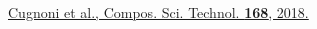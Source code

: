 \documentclass[first,firstsupp,lastsupp,last,hyperref,table]{ETHclass}
\begin{document}
\begin{frame}
\begin{columns}[c]
\begin{column}{0.5\textwidth}
\centering
\end{column}
\end{columns}
\vspace{0.15cm}
\begin{columns}[b]
\begin{column}{0.5\textwidth}
\centering
\pgfmathsetmacro{}
\pgfmathsetmacro{}
{\fontsize{\fontsizeref}{\stretchref} \selectfont \href{https://doi.org/10.1016/j.compscitech.2018.08.037}{Cugnoni et al., Compos. Sci. Technol. \textbf{168}, 2018.}}
\end{column}
\begin{column}{0.5\textwidth}
\centering
\end{column}
\end{columns}
\end{frame}

\end{document}
